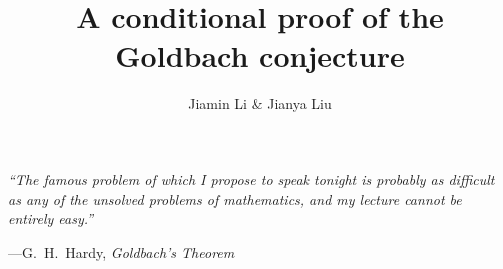 \documentclass[12pt,a4paper]{amsart}
\numberwithin{equation}{section}
\theoremstyle{plain}
\theoremstyle{definition}
\theoremstyle{remark}
\begin{document}
\title[A conditional proof of the Goldbach conjecture]{A conditional proof of the Goldbach conjecture}
\author{Jiamin Li \& Jianya Liu}
\address{Jiamin Li\\
Mathematical Research Center\\
Shandong University\\
Jinan, Shandong 250100\\
P. R. China}
\address{Jianya Liu\\
State Key Laboratory of Cryptography and Digital Economy Security \& Mathematical Research Center\\
Shandong University\\
Jinan, Shandong 250100\\
P. R. China}
\date{}
\maketitle

\begin{flushright}
\begin{minipage}{0.82\textwidth}
\small\itshape
``The famous problem of which I propose to speak tonight is
probably as difficult as any of the unsolved problems of
mathematics, and my lecture cannot be entirely easy.''
\par\smallskip
\raggedleft\normalfont
---G.~H.~Hardy, \emph{Goldbach's Theorem}~\cite[p.~1]{Hardy1922}
\end{minipage}
\end{flushright}
\end{document}
